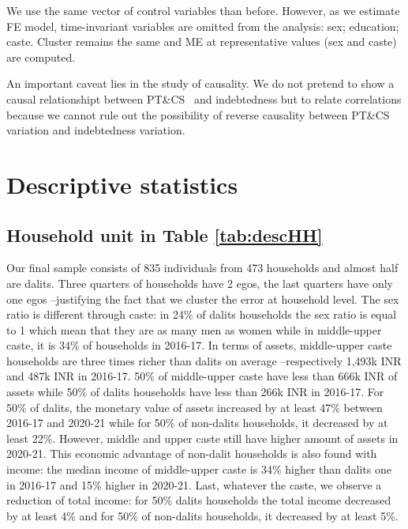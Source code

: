 \documentclass[a4paper, 11pt, onecolumn]{article}
\newcommand{\PTCS}{PT\&CS}
\begin{document}
We use the same vector of control variables than before.
However, as we estimate FE model, time-invariant variables are omitted from the analysis: sex; education; caste. 
Cluster remains the same and ME at representative values (sex and caste) are computed.

An important caveat lies in the study of causality.
We do not pretend to show a causal relationshipt between \PTCS~ and indebtedness but to relate correlations because we cannot rule out the possibility of reverse causality between \PTCS~ variation and indebtedness variation.



\section{Descriptive statistics}

\subsection{Household unit in Table \ref{tab:descHH}}
Our final sample consists of 835 individuals from 473 households and almost half are dalits.
Three quarters of households have 2 egos, the last quarters have only one egos --justifying the fact that we cluster the error at household level.
The sex ratio is different through caste: in 24\% of dalits households the sex ratio is equal to 1 which mean that they are as many men as women while in middle-upper caste, it is 34\% of households in 2016-17.
In terms of assets, middle-upper caste households are three times richer than dalits on average --respectively 1,493k INR and 487k INR in 2016-17.
50\% of middle-upper caste have less than 666k INR of assets while 50\% of dalits households have less than 266k INR in 2016-17.
For 50\% of dalits, the monetary value of assets increased by at least 47\% between 2016-17 and 2020-21 while for 50\% of non-dalits households, it decreased by at least 22\%.
However, middle and upper caste still have higher amount of assets in 2020-21.
This economic advantage of non-dalit households is also found with income: the median income of middle-upper caste is 34\% higher than dalits one in 2016-17 and 15\% higher in 2020-21.
Last, whatever the caste, we observe a reduction of total income: for 50\% dalits households the total income decreased by at least 4\% and for 50\% of non-dalits households, it decreased by at least 5\%.
		
\end{document}
